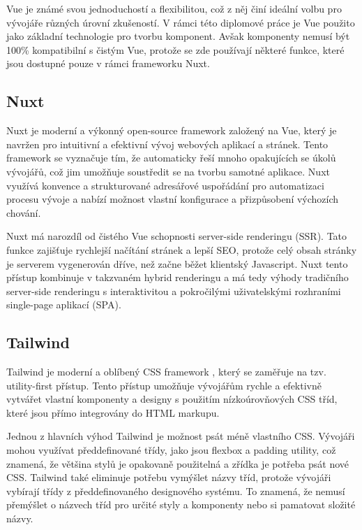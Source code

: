 Vue je známé svou jednoduchostí a flexibilitou, což z něj činí ideální volbu pro vývojáře různých úrovní zkušeností. V rámci této diplomové práce je Vue použito jako základní technologie pro tvorbu komponent. Avšak komponenty nemusí být 100\% kompatibilní s čistým Vue, protože se zde používají některé funkce, které jsou dostupné pouze v rámci frameworku Nuxt.

\subsection{Nuxt}
Nuxt je moderní a výkonný open-source framework založený na Vue, který je navržen pro intuitivní a efektivní vývoj webových aplikací a stránek. Tento framework se vyznačuje tím, že automaticky řeší mnoho opakujících se úkolů vývojářů, což jim umožňuje soustředit se na tvorbu samotné aplikace. Nuxt využívá konvence a strukturované adresářové uspořádání pro automatizaci procesu vývoje a nabízí možnost vlastní konfigurace a přizpůsobení výchozích chování.

Nuxt má narozdíl od čistého Vue schopnosti server-side renderingu (SSR). Tato funkce zajišťuje rychlejší načítání stránek a lepší SEO, protože celý obsah stránky je serverem vygenerován dříve, než začne běžet klientský Javascript. Nuxt tento přístup kombinuje v takzvaném hybrid renderingu a má tedy výhody tradičního server-side renderingu s interaktivitou a pokročilými uživatelskými rozhraními single-page aplikací (SPA). \cite{NuxtRenderingModes}

\subsection{Tailwind}
Tailwind je moderní a oblíbený CSS framework \cite{StateOfCSS} \cite{StateOfFrontend}, který se zaměřuje na tzv. utility-first přístup. Tento přístup umožňuje vývojářům rychle a efektivně vytvářet vlastní komponenty a designy s použitím nízkoúrovňových CSS tříd, které jsou přímo integrovány do HTML markupu.

Jednou z hlavních výhod Tailwind je možnost psát méně vlastního CSS. Vývojáři mohou využívat předdefinované třídy, jako jsou flexbox a padding utility, což znamená, že většina stylů je opakovaně použitelná a zřídka je potřeba psát nové CSS. Tailwind také eliminuje potřebu vymýšlet názvy tříd, protože vývojáři vybírají třídy z předdefinovaného designového systému. To znamená, že nemusí přemýšlet o  názvech tříd pro určité styly a komponenty nebo si pamatovat složité názvy. \cite{TailwindUtilityFirst}

